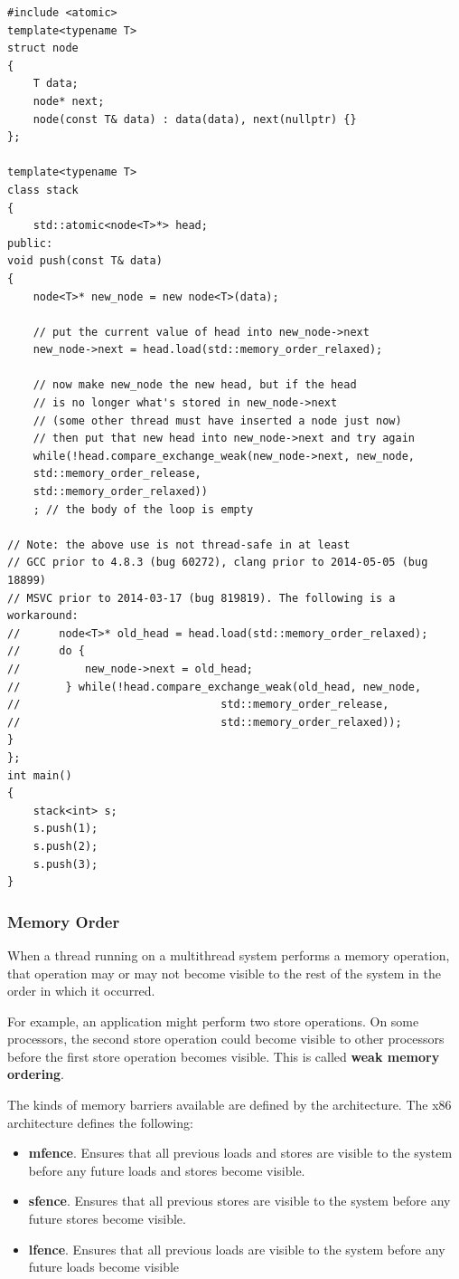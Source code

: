 \documentclass[12pt,a4paper]{report}
\begin{document}
\begin{lstlisting}
#include <atomic>
template<typename T>
struct node
{
	T data;
	node* next;
	node(const T& data) : data(data), next(nullptr) {}
};

template<typename T>
class stack
{
	std::atomic<node<T>*> head;
public:
void push(const T& data)
{
	node<T>* new_node = new node<T>(data);

	// put the current value of head into new_node->next
	new_node->next = head.load(std::memory_order_relaxed);

	// now make new_node the new head, but if the head
	// is no longer what's stored in new_node->next
	// (some other thread must have inserted a node just now)
	// then put that new head into new_node->next and try again
	while(!head.compare_exchange_weak(new_node->next, new_node,
	std::memory_order_release,
	std::memory_order_relaxed))
	; // the body of the loop is empty

// Note: the above use is not thread-safe in at least 
// GCC prior to 4.8.3 (bug 60272), clang prior to 2014-05-05 (bug 18899)
// MSVC prior to 2014-03-17 (bug 819819). The following is a workaround:
//      node<T>* old_head = head.load(std::memory_order_relaxed);
//      do {
//          new_node->next = old_head;
//       } while(!head.compare_exchange_weak(old_head, new_node,
//                               std::memory_order_release,
//                               std::memory_order_relaxed));
}
};
int main()
{
	stack<int> s;
	s.push(1);
	s.push(2);
	s.push(3);
}
\end{lstlisting}
\subsubsection*{Memory Order}
When a thread running on a multithread system performs a memory operation, that operation may or may not become visible to the rest of the system in the order in which it occurred.
\par
For example, an application might perform two store operations. On some processors, the second store operation could become visible to other processors before the first store operation becomes visible. This is called \textbf{weak memory ordering}.
\par
The kinds of memory barriers available are defined by the architecture. The x86 architecture defines the following:
\begin{itemize}
	\item \textbf{mfence}. Ensures that all previous loads and stores are visible to the system before any future loads and stores become visible.
	\item \textbf{sfence}. Ensures that all previous stores are visible to the system before any future stores become visible.
	\item \textbf{lfence}. Ensures that all previous loads are visible to the system before any future loads become visible
\end{itemize}
\end{document}
